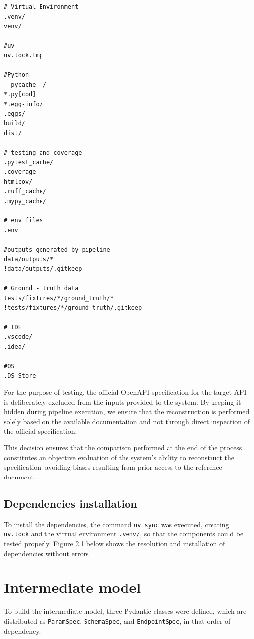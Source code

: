 \begin{lstlisting}[caption={version control exclusions}]
# Virtual Environment
.venv/
venv/

#uv
uv.lock.tmp

#Python
__pycache__/
*.py[cod]
*.egg-info/
.eggs/
build/
dist/

# testing and coverage
.pytest_cache/
.coverage
htmlcov/
.ruff_cache/
.mypy_cache/

# env files
.env

#outputs generated by pipeline
data/outputs/*
!data/outputs/.gitkeep

# Ground - truth data
tests/fixtures/*/ground_truth/*
!tests/fixtures/*/ground_truth/.gitkeep

# IDE
.vscode/
.idea/

#OS
.DS_Store
\end{lstlisting}

For the purpose of testing, the official OpenAPI specification for 
the target API is deliberately excluded from the inputs provided 
to the system. By keeping it hidden during pipeline execution, 
we ensure that the reconstruction is performed solely based on 
the available documentation and not through direct inspection of 
the official specification.

This decision ensures that the comparison performed at the end 
of the process constitutes an objective evaluation of the system’s 
ability to reconstruct the specification, avoiding biases resulting 
from prior access to the reference document.

\subsection{Dependencies installation}

To install the dependencies, the command \texttt{uv sync} was executed,
creating \texttt{uv.lock} and the virtual environment \texttt{.venv/}, 
so that the components could be tested properly. Figure 2.1 below
shows the resolution and installation of dependencies without 
errors


\section{Intermediate model}
To build the intermediate model, three Pydantic classes were defined,
which are distributed as \texttt{ParamSpec}, \texttt{SchemaSpec},
and \texttt{EndpointSpec}, in that order of dependency. 

